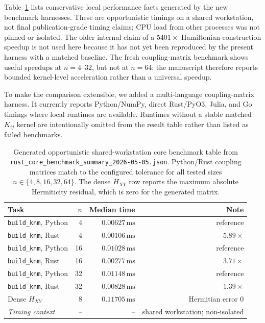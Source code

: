\documentclass[preprint,aps,physrev,superscriptaddress,floatfix,longbibliography]{revtex4-2}
\begin{document}
Table~\ref{tab:performance} lists conservative local performance facts generated
by the new benchmark harnesses. These are opportunistic timings on a shared
workstation, not final publication-grade timing claims; CPU load from other
processes was not pinned or isolated. The older internal claim of a
$5401\times$ Hamiltonian-construction speedup is not used here because it
has not yet been reproduced by the present harness with a matched baseline.
The fresh coupling-matrix benchmark shows useful speedups at $n=4$--$32$,
but not at $n=64$; the manuscript therefore reports bounded kernel-level
acceleration rather than a universal speedup.

To make the comparison extensible, we added a multi-language
coupling-matrix harness. It currently reports Python/NumPy, direct
Rust/PyO3, Julia, and Go timings where local runtimes are available.
Runtimes without a stable matched $K_{ij}$ kernel are intentionally omitted
from the result table rather than listed as failed benchmarks.

\begin{table}[tb]
\centering
\small
\begin{tabular}{lrrr}
\toprule
Task & $n$ & Median time & Note \\
\midrule
\texttt{build\_knm}, Python & 4 & $0.00627\,\mathrm{ms}$ & reference \\
\texttt{build\_knm}, Rust & 4 & $0.00106\,\mathrm{ms}$ & $5.89\times$ \\
\texttt{build\_knm}, Python & 16 & $0.01028\,\mathrm{ms}$ & reference \\
\texttt{build\_knm}, Rust & 16 & $0.00277\,\mathrm{ms}$ & $3.71\times$ \\
\texttt{build\_knm}, Python & 32 & $0.01148\,\mathrm{ms}$ & reference \\
\texttt{build\_knm}, Rust & 32 & $0.00828\,\mathrm{ms}$ & $1.39\times$ \\
Dense $H_{XY}$ & 8 & $0.11705\,\mathrm{ms}$ & Hermitian error 0 \\
\emph{Timing context} & -- & -- & shared workstation; non-isolated \\
\bottomrule
\end{tabular}
\caption{Generated opportunistic shared-workstation core benchmark table from
\texttt{rust\_core\_benchmark\_summary\_2026-05-05.json}. Python/Rust
coupling matrices match to the configured tolerance for all tested
sizes $n\in\{4,8,16,32,64\}$. The dense $H_{XY}$ row reports the maximum
absolute Hermiticity residual, which is zero for the generated matrix.}
\label{tab:performance}
\end{table}
\end{document}
